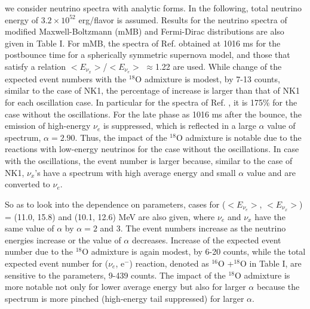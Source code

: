 \documentclass[preprint,12pt]{elsarticle}
\begin{document}
we consider neutrino spectra with analytic forms.
In the following, total neutrino energy of $3.2\times10^{52}$ erg/flavor is assumed.
Results for the neutrino spectra of modified Maxwell-Boltzmann (mMB) and Fermi-Dirac distributions are also given in Table I.
For mMB, the spectra of Ref. \cite{Tambora} obtained at 1016 ms for the postbounce time for a spherically symmetric supernova model, and those that satisfy a relation $<E_{\nu_x}>$/$<E_{\nu_e}>$ $\approx$1.22 \cite{KRJ} are used. 
While change of the expected event numbers with the $^{18}$O admixture is modest, by 7-13 counts, similar to the case of NK1, %
the percentage of increase is larger than that of NK1 for each oscillation case.
In particular for the spectra of Ref. \cite{Tambora}, it is 175\% for the case without the oscillations.
For the late phase as 1016 ms after the bounce, the emission of high-energy $\nu_e$ is suppressed, which is reflected in a large $\alpha$ value of spectrum, $\alpha=2.90$.
Thus, the impact of the $^{18}$O admixture is notable due to the reactions with low-energy neutrinos for the case without the oscillations.
In case with the oscillations, the event number is larger because, similar to the case of NK1, $\nu_x$'s have a spectrum with high average energy and small $\alpha$ value and are converted to $\nu_e$.

So as to look into the dependence on parameters, cases for ($<E_{\nu_e}>$, $<E_{\nu_x}>$) = (11.0, 15.8) and (10.1, 12.6) MeV are also given, where $\nu_e$ and $\nu_x$ have the same value of $\alpha$ by $\alpha=2$ and 3.
The event numbers increase as the neutrino energies increase or the value of $\alpha$ decreases. 
Increase of the expected event number due to the $^{18}$O admixture is again modest, by 6-20 counts, while the total expected event number for ($\nu_e$, e$^{-}$) reaction, denoted as $^{16}$O +$^{18}$O in Table I, are sensitive to the parameters, 9-439 counts.
The impact of the $^{18}$O admixture is more notable not only for lower average energy but also for larger $\alpha$ because the spectrum is more pinched (high-energy tail suppressed) for larger $\alpha$.
\end{document}
